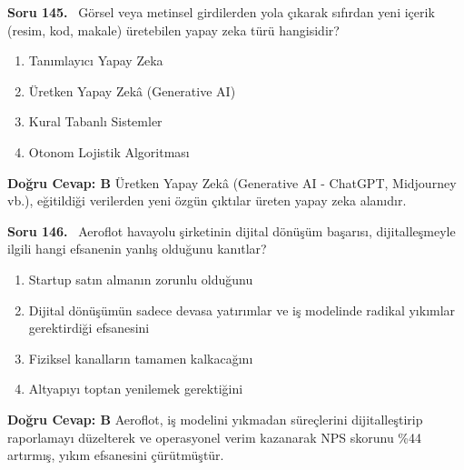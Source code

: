 \documentclass[11pt,a4paper,openany]{book}
\begin{document}
\needspace{5cm}
\vspace{8pt}
\noindent\textbf{\large\sffamily Soru 145.} \ Görsel veya metinsel girdilerden yola çıkarak sıfırdan yeni içerik (resim, kod, makale) üretebilen yapay zeka türü hangisidir?
\begin{enumerate}[label=\Alph*), leftmargin=25pt, topsep=4pt, itemsep=2pt]
    \item Tanımlayıcı Yapay Zeka
    \item Üretken Yapay Zekâ (Generative AI)
    \item Kural Tabanlı Sistemler
    \item Otonom Lojistik Algoritması
\end{enumerate}
\vspace{4pt}
\begin{tcolorbox}[title=Cevap ve Açıklama, colback=gray!3!white, colframe=primarycolor!90!black, arc=2mm, fonttitle=\bfseries\sffamily, top=6pt, bottom=6pt]
    \textbf{Doğru Cevap: B}
    \vspace{2pt}
    Üretken Yapay Zekâ (Generative AI - ChatGPT, Midjourney vb.), eğitildiği verilerden yeni özgün çıktılar üreten yapay zeka alanıdır.
\end{tcolorbox}
\vspace{10pt}

\needspace{5cm}
\vspace{8pt}
\noindent\textbf{\large\sffamily Soru 146.} \ Aeroflot havayolu şirketinin dijital dönüşüm başarısı, dijitalleşmeyle ilgili hangi efsanenin yanlış olduğunu kanıtlar?
\begin{enumerate}[label=\Alph*), leftmargin=25pt, topsep=4pt, itemsep=2pt]
    \item Startup satın almanın zorunlu olduğunu
    \item Dijital dönüşümün sadece devasa yatırımlar ve iş modelinde radikal yıkımlar gerektirdiği efsanesini
    \item Fiziksel kanalların tamamen kalkacağını
    \item Altyapıyı toptan yenilemek gerektiğini
\end{enumerate}
\vspace{4pt}
\begin{tcolorbox}[title=Cevap ve Açıklama, colback=gray!3!white, colframe=primarycolor!90!black, arc=2mm, fonttitle=\bfseries\sffamily, top=6pt, bottom=6pt]
    \textbf{Doğru Cevap: B}
    \vspace{2pt}
    Aeroflot, iş modelini yıkmadan süreçlerini dijitalleştirip raporlamayı düzelterek ve operasyonel verim kazanarak NPS skorunu \%44 artırmış, yıkım efsanesini çürütmüştür.
\end{tcolorbox}
\vspace{10pt}
\end{document}
